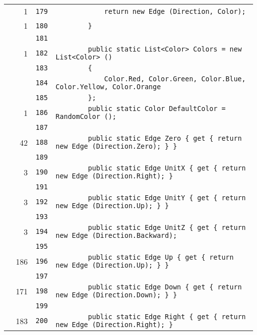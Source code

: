 \documentclass[a4paper,10pt]{article}
\begin{document}
\begin{longtable}[l]{lrrl}
\cellcolor{green} & 1 & \verb~179~ & \verb~            return new Edge (Direction, Color);~\\
\cellcolor{green} & 1 & \verb~180~ & \verb~        }~\\
\cellcolor{gray} &  & \verb~181~ & \verb~~\\
\cellcolor{green} & 1 & \verb~182~ & \verb~        public static List<Color> Colors = new List<Color> ()~\\
\cellcolor{gray} &  & \verb~183~ & \verb~        {~\\
\cellcolor{gray} &  & \verb~184~ & \verb~            Color.Red, Color.Green, Color.Blue, Color.Yellow, Color.Orange~\\
\cellcolor{gray} &  & \verb~185~ & \verb~        };~\\
\cellcolor{green} & 1 & \verb~186~ & \verb~        public static Color DefaultColor = RandomColor ();~\\
\cellcolor{gray} &  & \verb~187~ & \verb~~\\
\cellcolor{green} & 42 & \verb~188~ & \verb~        public static Edge Zero { get { return new Edge (Direction.Zero); } }~\\
\cellcolor{gray} &  & \verb~189~ & \verb~~\\
\cellcolor{green} & 3 & \verb~190~ & \verb~        public static Edge UnitX { get { return new Edge (Direction.Right); } ~\\
\cellcolor{gray} &  & \verb~191~ & \verb~~\\
\cellcolor{green} & 3 & \verb~192~ & \verb~        public static Edge UnitY { get { return new Edge (Direction.Up); } }~\\
\cellcolor{gray} &  & \verb~193~ & \verb~~\\
\cellcolor{green} & 3 & \verb~194~ & \verb~        public static Edge UnitZ { get { return new Edge (Direction.Backward);~\\
\cellcolor{gray} &  & \verb~195~ & \verb~~\\
\cellcolor{green} & 186 & \verb~196~ & \verb~        public static Edge Up { get { return new Edge (Direction.Up); } }~\\
\cellcolor{gray} &  & \verb~197~ & \verb~~\\
\cellcolor{green} & 171 & \verb~198~ & \verb~        public static Edge Down { get { return new Edge (Direction.Down); } }~\\
\cellcolor{gray} &  & \verb~199~ & \verb~~\\
\cellcolor{green} & 183 & \verb~200~ & \verb~        public static Edge Right { get { return new Edge (Direction.Right); } ~\\

\end{longtable}
\end{document}
